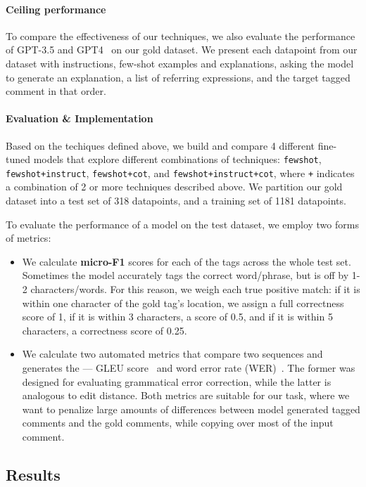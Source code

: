 \paragraph{Ceiling performance} To compare the effectiveness of our techniques, we also evaluate the performance of GPT-3.5 and GPT4~\citep{achiam2023gpt} on our gold dataset. We present each datapoint from our dataset with instructions, few-shot examples and explanations, asking the model to generate an explanation, a list of referring expressions, and the target tagged comment in that order.

\paragraph{Evaluation \& Implementation} Based on the techiques defined above, we build and compare 4 different fine-tuned models that explore different combinations of techniques: \texttt{fewshot}, \texttt{fewshot+instruct}, \texttt{fewshot+cot}, and \texttt{fewshot+instruct+cot}, where \texttt{+} indicates a combination of 2 or more techniques described above. We partition our gold dataset into a test set of 318 datapoints, and a training set of 1181 datapoints. 

To evaluate the performance of a model on the test dataset, we employ two forms of metrics:

\begin{itemize}
    \item We calculate \textbf{micro-F1} scores for each of the tags across the whole test set. Sometimes the model accurately tags the correct word/phrase, but is off by 1-2 characters/words. For this reason, we weigh each true positive match: if it is within one character of the gold tag's location, we assign a full correctness score of 1, if it is within 3 characters, a score of 0.5, and if it is within 5 characters, a correctness score of 0.25.
    \item We calculate two automated metrics that compare two sequences and generates the --- GLEU score~\citep{napoles-EtAl:2015:ACL-IJCNLP} and word error rate (WER)~\citep{woodard1982}. The former was designed for evaluating grammatical error correction, while the latter is analogous to edit distance. Both metrics are suitable for our task, where we want to penalize large amounts of differences between model generated tagged comments and the gold comments, while copying over most of the input comment.
\end{itemize}


\subsection{Results}

